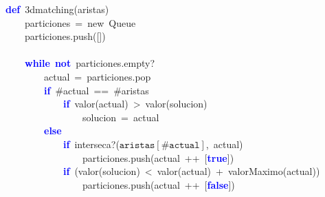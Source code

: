 \noindent
\mbox{}\textbf{\textcolor{Blue}{def}}\ 3dmatching\textcolor{BrickRed}{(}aristas\textcolor{BrickRed}{)} \\
\mbox{}\ \ \ \ particiones\ \textcolor{BrickRed}{=}\ new\ Queue \\
\mbox{}\ \ \ \ particiones\textcolor{BrickRed}{.}push\textcolor{BrickRed}{([])} \\
\mbox{} \\
\mbox{}\ \ \ \ \textbf{\textcolor{Blue}{while}}\ \textbf{\textcolor{Blue}{not}}\ particiones\textcolor{BrickRed}{.}empty? \\
\mbox{}\ \ \ \ \ \ \ \ actual\ \textcolor{BrickRed}{=}\ particiones\textcolor{BrickRed}{.}pop \\
\mbox{}\ \ \ \ \ \ \ \ \textbf{\textcolor{Blue}{if}}\ \#actual\ \textcolor{BrickRed}{==}\ \#aristas \\
\mbox{}\ \ \ \ \ \ \ \ \ \ \ \ \textbf{\textcolor{Blue}{if}}\ valor\textcolor{BrickRed}{(}actual\textcolor{BrickRed}{)}\ \textcolor{BrickRed}{\textgreater{}}\ valor\textcolor{BrickRed}{(}solucion\textcolor{BrickRed}{)} \\
\mbox{}\ \ \ \ \ \ \ \ \ \ \ \ \ \ \ \ solucion\ \textcolor{BrickRed}{=}\ actual \\
\mbox{}\ \ \ \ \ \ \ \ \textbf{\textcolor{Blue}{else}} \\
\mbox{}\ \ \ \ \ \ \ \ \ \ \ \ \textbf{\textcolor{Blue}{if}}\ interseca?\textcolor{BrickRed}{(}$\mathtt{aristas[\#actual]}$\textcolor{BrickRed}{,}\ actual\textcolor{BrickRed}{)} \\
\mbox{}\ \ \ \ \ \ \ \ \ \ \ \ \ \ \ \ particiones\textcolor{BrickRed}{.}push\textcolor{BrickRed}{(}actual\ \textcolor{BrickRed}{++}\ \textcolor{BrickRed}{[}\textbf{\textcolor{Blue}{true}}\textcolor{BrickRed}{])} \\
\mbox{}\ \ \ \ \ \ \ \ \ \ \ \ \textbf{\textcolor{Blue}{if}}\ \textcolor{BrickRed}{(}valor\textcolor{BrickRed}{(}solucion\textcolor{BrickRed}{)}\ \textcolor{BrickRed}{\textless{}}\ valor\textcolor{BrickRed}{(}actual\textcolor{BrickRed}{)}\ \textcolor{BrickRed}{+}\ valorMaximo\textcolor{BrickRed}{(}actual\textcolor{BrickRed}{))} \\
\mbox{}\ \ \ \ \ \ \ \ \ \ \ \ \ \ \ \ particiones\textcolor{BrickRed}{.}push\textcolor{BrickRed}{(}actual\ \textcolor{BrickRed}{++}\ \textcolor{BrickRed}{[}\textbf{\textcolor{Blue}{false}}\textcolor{BrickRed}{])} \\
\mbox{} \\
